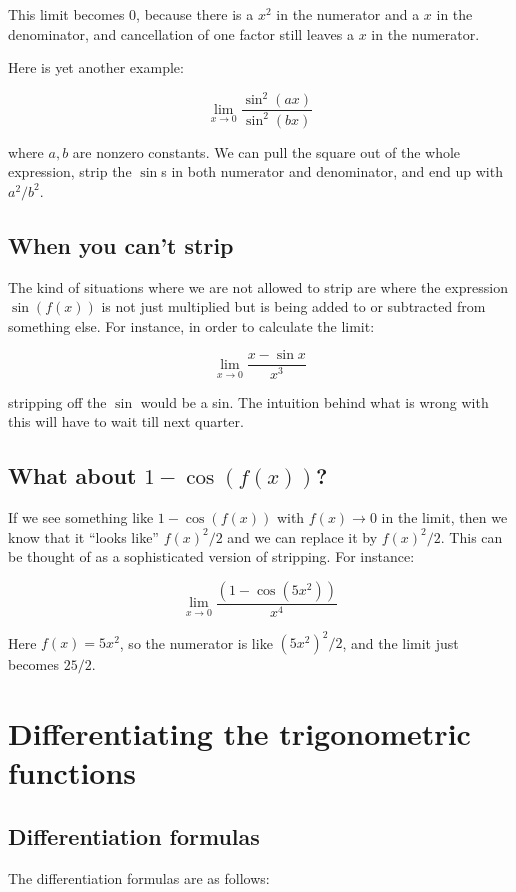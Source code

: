 \documentclass[10pt]{amsart}
\begin{document}
This limit becomes $0$, because there is a $x^2$ in the numerator and
a $x$ in the denominator, and cancellation of one factor still leaves
a $x$ in the numerator.

Here is yet another example:

$$\lim_{x \to 0} \frac{\sin^2(ax)}{\sin^2(bx)}$$

where $a,b$ are nonzero constants. We can pull the square out of the
whole expression, strip the $\sin$s in both numerator and denominator,
and end up with $a^2/b^2$.

\subsection*{When you can't strip}

The kind of situations where we are not allowed to strip are where the
expression $\sin(f(x))$ is not just multiplied but is being added to
or subtracted from something else. For instance, in order to calculate
the limit:

$$\lim_{x \to 0} \frac{x - \sin x}{x^3}$$

stripping off the $\sin$ would be a sin. The intuition behind what is
wrong with this will have to wait till next quarter.

\subsection*{What about $1 - \cos(f(x))$?}

If we see something like $1 - \cos(f(x))$ with $f(x) \to 0$ in the
limit, then we know that it ``looks like'' $f(x)^2/2$ and we can
replace it by $f(x)^2/2$. This can be thought of as a sophisticated
version of stripping. For instance:

$$\lim_{x \to 0} \frac{(1 - \cos(5x^2))}{x^4}$$

Here $f(x) = 5x^2$, so the numerator is like $(5x^2)^2/2$, and the
limit just becomes $25/2$.

\section{Differentiating the trigonometric functions}

\subsection{Differentiation formulas}

The differentiation formulas are as follows:
\end{document}
